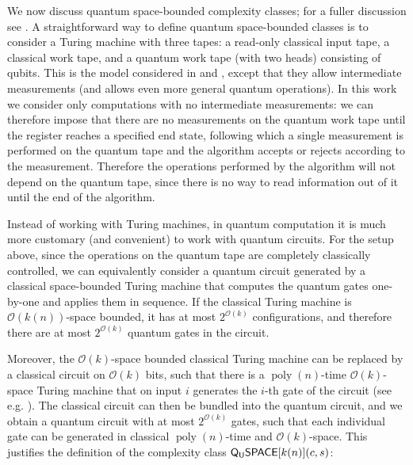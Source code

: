 \documentclass[11pt]{article}
\theoremstyle{definition}
\theoremstyle{remark}
\newcommand\QSPACE{{\sf{Q_{U}SPACE}}}
\DeclareMathOperator{\poly}{poly}
\begin{document}
We now discuss quantum space-bounded complexity classes; for a fuller discussion see \cite{Watrous09}. A straightforward way to define quantum space-bounded classes is to consider a Turing machine with three tapes: a read-only classical input tape, a classical work tape, and a quantum work tape (with two heads) consisting of qubits. This is the model considered in \cite{tashma} and \cite{Watrous03}, except that they allow intermediate measurements (and \cite{Watrous03} allows even more general quantum operations). In this work we consider only computations with no intermediate measurements: we can therefore impose that there are no measurements on the quantum work tape until the register reaches a specified end state, following which a single measurement is performed on the quantum tape and the algorithm accepts or rejects according to the measurement. Therefore the operations performed by the algorithm will not depend on the quantum tape, since there is no way to read information out of it until the end of the algorithm.

Instead of working with Turing machines, in quantum computation it is much more customary (and convenient) to work with quantum circuits. For the setup above, since the operations on the quantum tape are completely classically controlled, we can equivalently consider a quantum circuit generated by a classical space-bounded Turing machine that computes the quantum gates one-by-one and applies them in sequence. If the classical Turing machine is $\mathcal{O}(k(n))$-space bounded, it has at most $2^{\mathcal{O}(k)}$ configurations, and therefore there are at most $2^{\mathcal{O}(k)}$ quantum gates in the circuit. 

Moreover, the $\mathcal{O}(k)$-space bounded classical Turing machine can be replaced by a classical circuit on $\mathcal{O}(k)$ bits, such that there is a $\poly(n)$-time $\mathcal{O}(k)$-space Turing machine that on input $i$ generates the $i$-th gate of the circuit (see e.g. \cite[Section~6.8]{ab09}). The classical circuit can then be bundled into the quantum circuit, and we obtain a quantum circuit with at most $2^{\mathcal{O}(k)}$ gates, such that each individual gate can be generated in classical $\poly(n)$-time and $\mathcal{O}(k)$-space. This justifies the definition of the complexity class $\QSPACE[k(n)](c,s)$:
\end{document}
